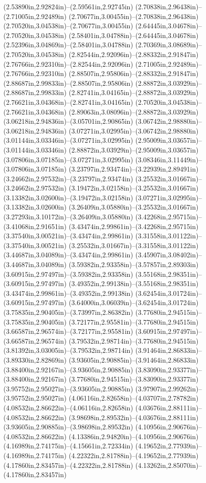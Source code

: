 (2.53890in,2.92824in)--(2.59561in,2.92745in) (2.70838in,2.96438in)--(2.71005in,2.92489in) (2.70677in,3.00455in)--(2.70838in,2.96438in) (2.70520in,3.04538in)--(2.70677in,3.00455in) (2.64445in,3.04678in)--(2.70520in,3.04538in) (2.58401in,3.04788in)--(2.64445in,3.04678in) (2.52396in,3.04869in)--(2.58401in,3.04788in) (2.70369in,3.08689in)--(2.70520in,3.04538in) (2.82544in,2.92096in)--(2.88332in,2.91847in) (2.76766in,2.92310in)--(2.82544in,2.92096in) (2.71005in,2.92489in)--(2.76766in,2.92310in) (2.88507in,2.95806in)--(2.88332in,2.91847in) (2.88687in,2.99833in)--(2.88507in,2.95806in) (2.88872in,3.03929in)--(2.88687in,2.99833in) (2.82741in,3.04165in)--(2.88872in,3.03929in) (2.76621in,3.04368in)--(2.82741in,3.04165in) (2.70520in,3.04538in)--(2.76621in,3.04368in) (2.89063in,3.08096in)--(2.88872in,3.03929in) (3.06218in,2.94836in)--(3.05701in,2.90865in) (3.06742in,2.98880in)--(3.06218in,2.94836in) (3.07271in,3.02995in)--(3.06742in,2.98880in) (3.01144in,3.03346in)--(3.07271in,3.02995in) (2.95009in,3.03657in)--(3.01144in,3.03346in) (2.88872in,3.03929in)--(2.95009in,3.03657in) (3.07806in,3.07185in)--(3.07271in,3.02995in) (3.08346in,3.11449in)--(3.07806in,3.07185in) (3.23797in,2.93474in)--(3.22939in,2.89491in) (3.24662in,2.97532in)--(3.23797in,2.93474in) (3.25532in,3.01667in)--(3.24662in,2.97532in) (3.19472in,3.02158in)--(3.25532in,3.01667in) (3.13382in,3.02600in)--(3.19472in,3.02158in) (3.07271in,3.02995in)--(3.13382in,3.02600in) (3.26409in,3.05880in)--(3.25532in,3.01667in) (3.27293in,3.10172in)--(3.26409in,3.05880in) (3.42268in,2.95715in)--(3.41068in,2.91651in) (3.43474in,2.99861in)--(3.42268in,2.95715in) (3.37540in,3.00521in)--(3.43474in,2.99861in) (3.31558in,3.01122in)--(3.37540in,3.00521in) (3.25532in,3.01667in)--(3.31558in,3.01122in) (3.44687in,3.04089in)--(3.43474in,2.99861in) (3.45907in,3.08402in)--(3.44687in,3.04089in) (3.59382in,2.93358in)--(3.57857in,2.89303in) (3.60915in,2.97497in)--(3.59382in,2.93358in) (3.55168in,2.98351in)--(3.60915in,2.97497in) (3.49352in,2.99138in)--(3.55168in,2.98351in) (3.43474in,2.99861in)--(3.49352in,2.99138in) (3.62454in,3.01724in)--(3.60915in,2.97497in) (3.64000in,3.06039in)--(3.62454in,3.01724in) (3.75835in,2.90405in)--(3.73997in,2.86382in) (3.77680in,2.94515in)--(3.75835in,2.90405in) (3.72177in,2.95581in)--(3.77680in,2.94515in) (3.66587in,2.96574in)--(3.72177in,2.95581in) (3.60915in,2.97497in)--(3.66587in,2.96574in) (3.79532in,2.98714in)--(3.77680in,2.94515in) (3.81392in,3.03005in)--(3.79532in,2.98714in) (3.91464in,2.86833in)--(3.89330in,2.82869in) (3.93605in,2.90885in)--(3.91464in,2.86833in) (3.88400in,2.92167in)--(3.93605in,2.90885in) (3.83090in,2.93377in)--(3.88400in,2.92167in) (3.77680in,2.94515in)--(3.83090in,2.93377in) (3.95752in,2.95027in)--(3.93605in,2.90885in) (3.97907in,2.99262in)--(3.95752in,2.95027in) (4.06116in,2.82658in)--(4.03707in,2.78782in) (4.08532in,2.86622in)--(4.06116in,2.82658in) (4.03676in,2.88111in)--(4.08532in,2.86622in) (3.98698in,2.89532in)--(4.03676in,2.88111in) (3.93605in,2.90885in)--(3.98698in,2.89532in) (4.10956in,2.90676in)--(4.08532in,2.86622in) (4.13386in,2.94820in)--(4.10956in,2.90676in) (4.16989in,2.74175in)--(4.15661in,2.72334in) (4.19652in,2.77939in)--(4.16989in,2.74175in) (4.22322in,2.81788in)--(4.19652in,2.77939in) (4.17860in,2.83457in)--(4.22322in,2.81788in) (4.13262in,2.85070in)--(4.17860in,2.83457in) 